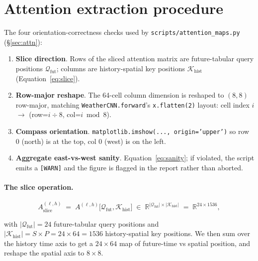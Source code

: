 
\section{Attention extraction procedure}
\label{app:attention}

The four orientation-correctness checks used by \texttt{scripts/attention\_maps.py} (\S\ref{sec:attn}):

\begin{enumerate}\setlength\itemsep{1pt}
  \item \textbf{Slice direction}. Rows of the sliced attention matrix are future-tabular query positions $\mathcal{Q}_{\text{fut}}$; columns are history-spatial key positions $\mathcal{K}_{\text{hist}}$ (Equation~\ref{eq:slice}).
  \item \textbf{Row-major reshape}. The 64-cell column dimension is reshaped to $(8, 8)$ row-major, matching \texttt{WeatherCNN.forward}'s \texttt{x.flatten(2)} layout: cell index $i$ $\to$ (row=$i\div 8$, col=$i\bmod 8$).
  \item \textbf{Compass orientation}. \texttt{matplotlib.imshow(..., origin='upper')} so row 0 (north) is at the top, col 0 (west) is on the left.
  \item \textbf{Aggregate east-vs-west sanity}. Equation~\ref{eq:sanity}; if violated, the script emits a \texttt{[WARN]} and the figure is flagged in the report rather than aborted.
\end{enumerate}

\paragraph{The slice operation.}

\begin{equation}
A^{(\ell, h)}_{\text{slice}} \;=\; A^{(\ell, h)}\bigl[\mathcal{Q}_{\text{fut}}, \mathcal{K}_{\text{hist}}\bigr]
\;\in\; \mathbb{R}^{|\mathcal{Q}_{\text{fut}}| \times |\mathcal{K}_{\text{hist}}|}
\;=\; \mathbb{R}^{24 \times 1536},
\label{eq:slice}
\end{equation}

with $|\mathcal{Q}_{\text{fut}}| = 24$ future-tabular query positions and $|\mathcal{K}_{\text{hist}}| = S \times P = 24 \times 64 = 1536$ history-spatial key positions. We then sum over the history time axis to get a $24 \times 64$ map of future-time vs spatial position, and reshape the spatial axis to $8 \times 8$.

